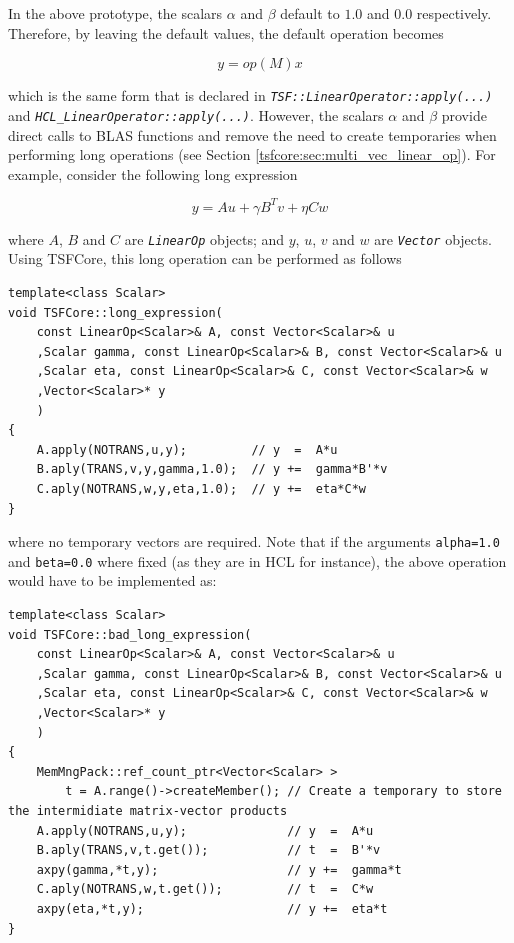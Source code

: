 In the above prototype, the scalars $\alpha$ and $\beta$ default to
$1.0$ and $0.0$ respectively.  Therefore, by leaving the default values,
the default operation becomes

\[
y = op(M) x
\]

which is the same form that is declared in
\texttt{\textit{TSF\-::Linear\-Operator\-::apply(\-...)}}  and
\texttt{\textit{HCL\-\_Linear\-Operator\-::apply(\-...)}}.  However, the scalars
$\alpha$ and $\beta$ provide direct calls to BLAS functions and remove
the need to create temporaries when performing long operations (see
Section \ref{tsfcore:sec:multi_vec_linear_op}).  For example, consider
the following long expression

\[
y = A u + \gamma B^T v + \eta C w
\]

where $A$, $B$ and $C$ are \texttt{\textit{LinearOp}} objects; and $y$,
$u$, $v$ and $w$ are \texttt{\textit{Vector}} objects.  Using TSFCore, this
long operation can be performed as follows

{\tiny\begin{verbatim}
template<class Scalar>
void TSFCore::long_expression(
    const LinearOp<Scalar>& A, const Vector<Scalar>& u
    ,Scalar gamma, const LinearOp<Scalar>& B, const Vector<Scalar>& u
    ,Scalar eta, const LinearOp<Scalar>& C, const Vector<Scalar>& w
    ,Vector<Scalar>* y
    )
{
    A.apply(NOTRANS,u,y);         // y  =  A*u
    B.aply(TRANS,v,y,gamma,1.0);  // y +=  gamma*B'*v
    C.aply(NOTRANS,w,y,eta,1.0);  // y +=  eta*C*w
}
\end{verbatim}}

where no temporary vectors are required.  Note that if the arguments
\texttt{alpha=1.0} and \texttt{beta=0.0} where fixed (as they are
in HCL for instance), the above operation would have to be implemented
as:

{\tiny\begin{verbatim}
template<class Scalar>
void TSFCore::bad_long_expression(
    const LinearOp<Scalar>& A, const Vector<Scalar>& u
    ,Scalar gamma, const LinearOp<Scalar>& B, const Vector<Scalar>& u
    ,Scalar eta, const LinearOp<Scalar>& C, const Vector<Scalar>& w
    ,Vector<Scalar>* y
    )
{
    MemMngPack::ref_count_ptr<Vector<Scalar> >
        t = A.range()->createMember(); // Create a temporary to store the intermidiate matrix-vector products
    A.apply(NOTRANS,u,y);              // y  =  A*u
    B.aply(TRANS,v,t.get());           // t  =  B'*v
    axpy(gamma,*t,y);                  // y +=  gamma*t
    C.aply(NOTRANS,w,t.get());         // t  =  C*w
    axpy(eta,*t,y);                    // y +=  eta*t
}
\end{verbatim}}

